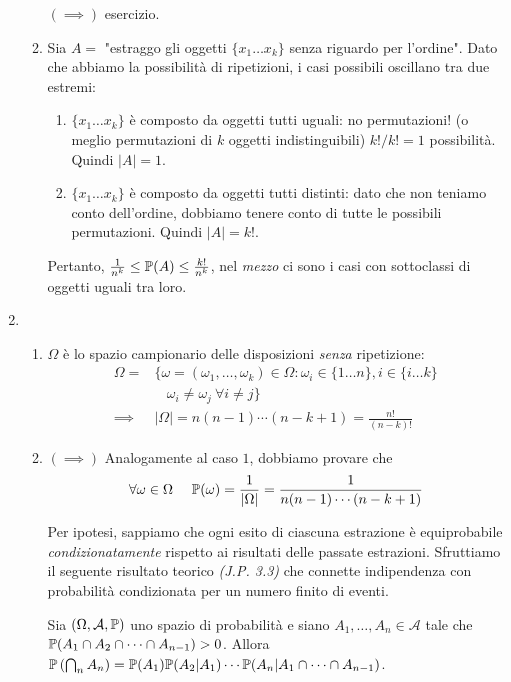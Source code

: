\begin{enumerate}
\begin{enumerate}
$( \implies )$ esercizio.
\item Sia $A=$ "estraggo gli oggetti $\{x_{1} \dots x_{k}\}$ senza riguardo per l'ordine". Dato che abbiamo la possibilità di ripetizioni, i casi possibili oscillano tra due estremi:
\begin{enumerate}
\item $\{x_{1} \dots x_{k}\}$ è composto da oggetti tutti uguali: no permutazioni! (o meglio permutazioni di $k$ oggetti indistinguibili) $k!/k!=1$ possibilità. Quindi $| A| =1$.
\item $\{x_{1} \dots x_{k}\}$ è composto da oggetti tutti distinti: dato che non teniamo conto dell'ordine, dobbiamo tenere conto di tutte le possibili permutazioni. Quindi $| A| =k!$.
\end{enumerate}

Pertanto, $\frac{1}{n^{k}} \leq \mathbb{P}( A) \leq \frac{k!}{n^{k}}$, nel \textit{mezzo} ci sono i casi con sottoclassi di oggetti uguali tra loro.
\end{enumerate}
\item 
\begin{enumerate}
\item $\Omega $ è lo spazio campionario delle disposizioni \textit{senza} ripetizione:\begin{align*}
\Omega = & \{\omega =( \omega _{1} ,\dots ,\omega _{k}) \in \Omega :\omega _{i} \in \{1\dots n\} ,i\in \{i\dots k\}\\
 & \ \ \ \ \omega _{i} \neq \omega _{j} \ \forall i\neq j\}\\
\implies  & | \Omega | =n( n-1) \cdots ( n-k+1) =\frac{n!}{( n-k) !}
\end{align*}
\item $( \implies )$ Analogamente al caso $1$, dobbiamo provare che\begin{equation*}
\forall \omega \in \Omega \ \ \ \ \mathbb{P}( \omega ) =\frac{1}{| \Omega | } =\frac{1}{n( n-1) \cdots ( n-k+1)}
\end{equation*}

Per ipotesi, sappiamo che ogni esito di ciascuna estrazione è equiprobabile \textit{condizionatamente} rispetto ai risultati delle passate estrazioni. Sfruttiamo il seguente risultato teorico \textit{(J.P. 3.3)} che connette indipendenza con probabilità condizionata per un numero finito di eventi.

Sia $( \Omega ,\mathcal{A} ,\mathbb{P})$ uno spazio di probabilità e siano $A_{1} ,\dots ,A_{n} \in \mathcal{A}$ tale che $\mathbb{P}( A_{1} \cap A_{2} \cap \cdots \cap A_{n-1})  >0$. Allora $\mathbb{P}\left(\bigcap _{n} A_{n}\right) =\mathbb{P}( A_{1})\mathbb{P}( A_{2} |A_{1}) \cdots \mathbb{P}( A_{n} |A_{1} \cap \cdots \cap A_{n-1})$.


\end{enumerate}
\end{enumerate}
